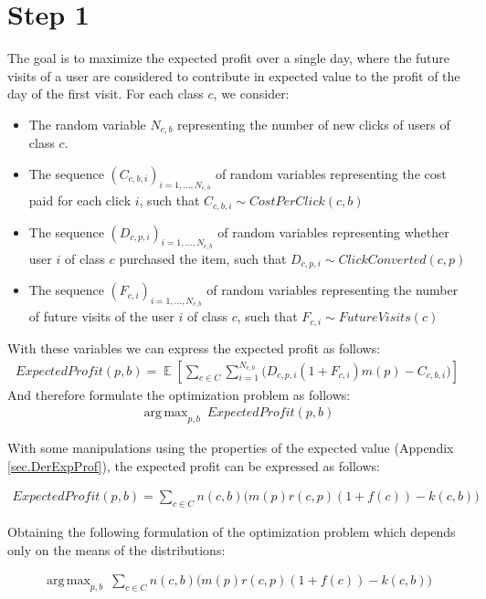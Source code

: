 \documentclass[11pt]{article} %
\DeclareMathOperator{\EX}{\mathbb{E}}
\DeclareMathOperator*{\argmax}{arg\,max}
\begin{document}
\section{Step 1}
The goal is to maximize the expected profit over a single day, where the future visits of a user are considered to contribute in expected value to the profit of the day of the first visit.
\newline
\newline
For each class $c$, we consider:
\begin{itemize}
\item The random variable $N_{c,b}$ representing the number of new clicks of users of class $c$.
\item The sequence $(C_{c,b,i})_{i=1,...,N_{c,b}}$ of random variables representing the cost paid for each click $i$, such that $C_{c,b,i}\sim CostPerClick(c,b)$
\item The sequence $(D_{c,p,i})_{i=1,...,N_{c,b}}$ of random variables representing whether user $i$ of class $c$ purchased the item, such that $D_{c,p,i}\sim ClickConverted(c,p)$
\item The sequence $(F_{c,i})_{i=1,...,N_{c,b}}$ of random variables representing the number of future visits of the user $i$ of class $c$, such that $F_{c,i}\sim FutureVisits(c)$
\end{itemize}
With these variables we can express the expected profit as follows:
\begin{align*}
ExpectedProfit(p,b) = \EX\left[\sum_{c \in C}{\sum_{i =1}^{N_{c,b}}{\bigg( D_{c,p,i}(1+F_{c,i})m(p)-C_{c,b,i}\bigg)}}\right]
\end{align*}
And therefore formulate the optimization problem as follows:
\begin{align*}
\argmax_{p,b}{\ ExpectedProfit(p,b)}
\end{align*}

With some manipulations using the properties of the expected value (Appendix \ref{sec.DerExpProf}), the expected profit can be expressed as follows:

\begin{align*}
ExpectedProfit(p,b)=\sum_{c \in C}{n(c,b)\Big(m(p)r(c,p)(1+f(c))-k(c,b)\Big)}
\end{align*}

Obtaining the following formulation of the optimization problem which depends only on the means of the distributions:

\begin{align*}
\argmax_{p,b}{\ \sum_{c \in C}{n(c,b)\Big(m(p)r(c,p)(1+f(c))-k(c,b)\Big)}}
\end{align*}
\end{document}
